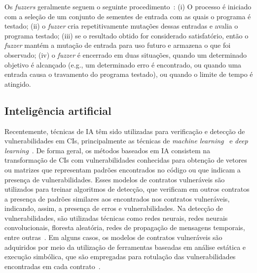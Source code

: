 Os \textit{fuzzers} geralmente seguem o seguinte procedimento~\cite{klees2018fuzz-evaluating}: (i) O processo é iniciado com a seleção de um conjunto de sementes de entrada com as quais o programa é testado; (ii) o \textit{fuzzer} cria repetitivamente mutações dessas entradas e avalia o programa testado; (iii) se o resultado obtido for considerado satisfatório, então o \textit{fuzzer} mantém a mutação de entrada para uso futuro e armazena o que foi observado; (iv) o \textit{fuzzer} é encerrado em duas situações, quando um determinado objetivo é alcançado (e.g., um determinado erro é encontrado, ou quando uma entrada causa o travamento do programa testado), ou quando o limite de tempo é atingido.

\subsection{Inteligência artificial} \label{tex:fund:ia}

Recentemente, técnicas de IA têm sido utilizadas para verificação e detecção de vulnerabilidades em CIs, principalmente as técnicas de \textit{machine learning}~\cite{xing2020new-08, sun2021attention-14, wang2020contractward-20} e \textit{deep learning}~\cite{gao2020checking-16, qian2020towards-96}. De forma geral, os métodos baseados em IA consistem na transformação de CIs com vulnerabilidades conhecidas para obtenção de vetores ou matrizes que representam padrões encontrados no código ou que indicam a presença de vulnerabilidades. Esses modelos de contratos vulneráveis são utilizados para treinar algoritmos de detecção, que verificam em outros contratos a presença de padrões similares aos encontrados nos contratos vulneráveis, indicando, assim, a presença de erros e vulnerabilidades. Na detecção de vulnerabilidades, são utilizadas técnicas como redes neurais, redes neurais convolucionais, floresta aleatória, redes de propagação de mensagens temporais, entre outras~\cite{xing2020new-08, zhuangsmart-84, sun2021attention-14, gao2020checking-16}. Em alguns casos, os modelos de contratos vulneráveis são adquiridos por meio da utilização de ferramentas baseadas em análise estática e execução simbólica, que são empregadas para rotulação das vulnerabilidades encontradas em cada contrato~\cite{wang2020contractward-20, momeni2019machine-54}.

